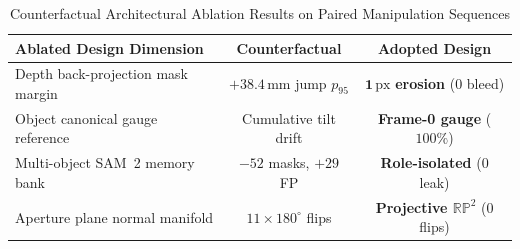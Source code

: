 \documentclass[10pt,journal]{IEEEtran}
\begin{document}
\begin{table}[t]
    \centering
    \caption{Counterfactual Architectural Ablation Results on Paired Manipulation Sequences}
    \label{tab:counterfactual_ablations}
    \scriptsize
    \begin{tabular}{@{}p{3.4cm}cc@{}}
        \toprule
        \textbf{Ablated Design Dimension} & \textbf{Counterfactual} & \textbf{Adopted Design} \\
        \midrule
        Depth back-projection mask margin & $+38.4\,\mathrm{mm}$ jump $p_{95}$ & $\mathbf{1\,\mathrm{px}}$ \textbf{erosion} ($0$ bleed) \\
        Object canonical gauge reference & Cumulative tilt drift & \textbf{Frame-0 gauge} ($100\%$) \\
        Multi-object SAM~2 memory bank & $-52$ masks, $+29$ FP & \textbf{Role-isolated} ($0$ leak) \\
        Aperture plane normal manifold & $11 \times 180^\circ$ flips & \textbf{Projective $\mathbb{RP}^2$} ($0$ flips) \\
        \bottomrule
    \end{tabular}
\end{table}
\end{document}
